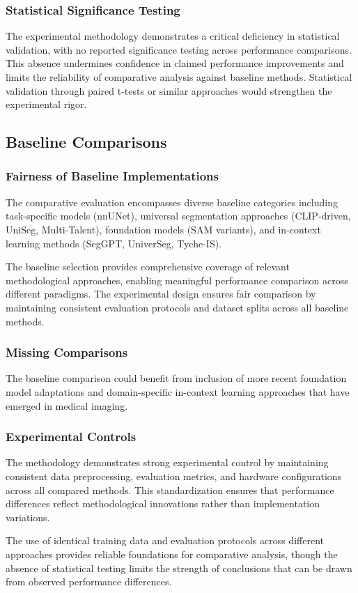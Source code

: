 \subsubsection{Statistical Significance Testing}
The experimental methodology demonstrates a critical deficiency in statistical validation, with no reported significance testing across performance comparisons. This absence undermines confidence in claimed performance improvements and limits the reliability of comparative analysis against baseline methods. Statistical validation through paired t-tests or similar approaches would strengthen the experimental rigor.

\subsection{Baseline Comparisons}
\subsubsection{Fairness of Baseline Implementations}
The comparative evaluation encompasses diverse baseline categories including task-specific models (nnUNet), universal segmentation approaches (CLIP-driven, UniSeg, Multi-Talent), foundation models (SAM variants), and in-context learning methods (SegGPT, UniverSeg, Tyche-IS).

The baseline selection provides comprehensive coverage of relevant methodological approaches, enabling meaningful performance comparison across different paradigms. The experimental design ensures fair comparison by maintaining consistent evaluation protocols and dataset splits across all baseline methods.

\subsubsection{Missing Comparisons}
The baseline comparison could benefit from inclusion of more recent foundation model adaptations and domain-specific in-context learning approaches that have emerged in medical imaging.

\subsubsection{Experimental Controls}
The methodology demonstrates strong experimental control by maintaining consistent data preprocessing, evaluation metrics, and hardware configurations across all compared methods. This standardization ensures that performance differences reflect methodological innovations rather than implementation variations.

The use of identical training data and evaluation protocols across different approaches provides reliable foundations for comparative analysis, though the absence of statistical testing limits the strength of conclusions that can be drawn from observed performance differences.
